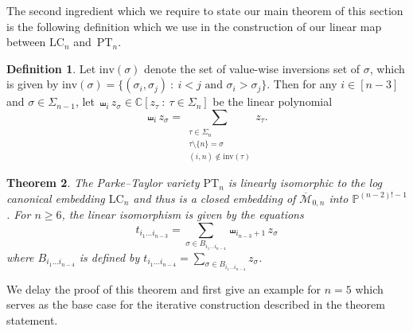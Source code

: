 \documentclass[12pt, reqno]{amsart}
\numberwithin{equation}{section}
\theoremstyle{plain}
\newtheorem{theorem}{Theorem}[section]
\theoremstyle{definition}
\newtheorem{definition}[theorem]{Definition}
\newcommand{\cc}{\mathbb{C}}
\newcommand{\pp}{\mathbb{P}}
\newcommand{\monbar}{\overline{\mathcal{M}}_{0, n}}
\newcommand{\pt}{\mathrm{PT}}
\newcommand{\lc}{\mathrm{LC}}
\newcommand{\inv}{\mathrm{inv}}
\begin{document}
The second ingredient which we require to state our main theorem of this section is the following definition which we use in the construction of our linear map between $\lc_n$ and~$\pt_n$. 


\begin{definition}
\label{defn:shuffle-sum}
Let $\inv(\sigma)$ denote the set of value-wise inversions set of $\sigma$, which is given by $\inv(\sigma) = \{(\sigma_i, \sigma_j) ~:~  i < j \text{ and } \sigma_i > \sigma_j \}$. Then for any $i \in [n-3]$ and $\sigma \in \Sigma_{n-1}$, let $\shuffle_i z_\sigma \in \cc[z_\tau ~:~ \tau \in \Sigma_n
]$ be the linear polynomial
\[
\displaystyle \shuffle_{i} z_\sigma = \sum_{\substack{\tau \in \Sigma_n \\ \tau \setminus \{n \} = \sigma \\ (i, n) \notin \inv(\tau)}} z_\tau. 
\]
\end{definition}



\begin{theorem}
\label{thm:log-canon-Parke--Taylor}
The Parke--Taylor variety $\pt_n$ is linearly isomorphic to the log canonical embedding $\lc_n$ and thus is a closed embedding of $\monbar$ into $\pp^{(n-2)! - 1}$. For $n \geq 6$, the linear isomorphism is given by the equations
\[
t_{i_1 \ldots i_{n-3}} = \sum_{\sigma \in B_{i_1 \ldots i_{n-4}}} \shuffle_{i_{n-3}+1} z_\sigma
\]
where $B_{i_1 \ldots i_{n-4}}$ is defined by $t_{i_1 \ldots i_{n-4}} = \sum_{\sigma \in B_{i_1 \ldots i_{n-4}}} z_\sigma$.
\end{theorem}

We delay the proof of this theorem and first give an example for $n = 5$ which serves as the base case for the iterative construction described in the theorem statement. 
\end{document}
